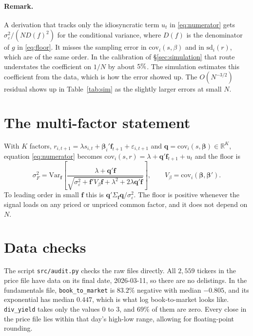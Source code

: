 \documentclass[11pt,a4paper]{article}
\newcommand{\sF}{\sigma_F}
\begin{document}
\paragraph{Remark.} A derivation that tracks only the idiosyncratic term $u_t$
in \eqref{eq:numerator} gets $\sigma_\varepsilon^2/(N D(f)^2)$ for the
conditional variance, where $D(f)$ is the denominator of $g$ in \eqref{eq:floor}. It
misses the sampling error in $\mathrm{cov}_i(s,\beta)$ and in $\mathrm{sd}_i(r)$, which
are of the same order. In the calibration of \S\ref{sec:simulation} that route
understates the coefficient on $1/N$ by about $5\%$. The simulation estimates this coefficient
from the data, which is how the error showed up. The $O(N^{-3/2})$ residual shows up in Table~\ref{tab:sim} as the slightly larger
errors at small $N$.

\section{The multi-factor statement}\label{app:multi}

With $K$ factors, $r_{i,t+1} = \lambda s_{i,t} + \boldsymbol\beta_i'\mathbf{f}_{t+1} +
\varepsilon_{i,t+1}$ and $\mathbf{q} = \mathrm{cov}_i(s, \boldsymbol\beta) \in
\mathbb{R}^K$, equation \eqref{eq:numerator} becomes
$\mathrm{cov}_i(s,r) = \lambda + \mathbf{q}'\mathbf{f}_{t+1} + u_t$ and the floor is
\begin{equation*}
\sF^2 = \mathrm{Var}_{\mathbf f}\!\left[
\frac{\lambda + \mathbf{q}'\mathbf{f}}
{\sqrt{\sigma_\varepsilon^2 + \mathbf{f}'V_\beta \mathbf{f} + \lambda^2
 + 2\lambda\mathbf{q}'\mathbf{f}}}\right],
\qquad V_\beta = \mathrm{cov}_i(\boldsymbol\beta, \boldsymbol\beta').
\end{equation*}
To leading order in small $\mathbf f$ this is $\mathbf{q}'\Sigma_{\mathbf f}\mathbf{q}/
\sigma_\varepsilon^2$. The floor is positive whenever the
signal loads on any priced or unpriced common factor, and it does not depend on $N$.

\section{Data checks}\label{app:audit}

The script \texttt{src/audit.py} checks the raw files directly. All $2{,}559$ tickers in
the price file have data on its final date, 2026-03-11, so there are no delistings. In
the fundamentals file, \texttt{book\_to\_market} is $83.2\%$ negative with median
$-0.805$, and its exponential has median $0.447$, which is what log book-to-market looks
like. \texttt{div\_yield} takes only the values $0$ to $3$, and $69\%$ of them are zero.
Every close in the price file lies within that day's high-low range, allowing for
floating-point rounding.
\end{document}
